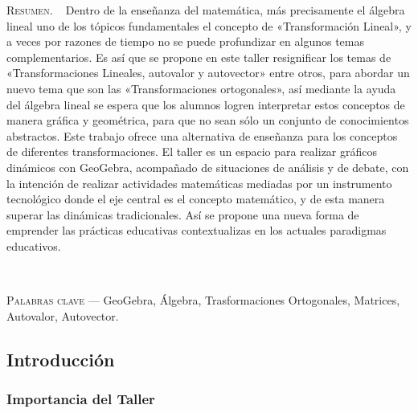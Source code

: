 \begin{center}
	\begin{minipage}{0.75\linewidth} \small
		\textsc{Resumen}. ~
		Dentro de la enseñanza del matemática, más precisamente el álgebra lineal uno de los tópicos fundamentales el concepto de «Transformación Lineal», y a veces por razones de tiempo no se puede profundizar en algunos temas complementarios. Es así que se propone en este taller resignificar los temas de «Transformaciones Lineales, autovalor y autovector» entre otros, para abordar un nuevo tema que son las «Transformaciones ortogonales», así mediante la ayuda del álgebra lineal se espera que los alumnos logren interpretar estos conceptos de manera gráfica y geométrica, para que no sean sólo un conjunto de conocimientos abstractos. Este trabajo ofrece una alternativa de enseñanza para los conceptos de diferentes transformaciones. El taller es un espacio para realizar gráficos dinámicos con GeoGebra, acompañado de situaciones de análisis y de debate, con la intención de realizar actividades matemáticas mediadas por un instrumento tecnológico donde el eje central es el concepto matemático, y de esta manera superar las dinámicas tradicionales. Así se propone una nueva forma de emprender las prácticas educativas contextualizas en los actuales paradigmas educativos.
	\end{minipage}\\
	
	\vspace{0.5em}
	
	\begin{minipage}{0.75\linewidth} \small
		\textsc{Palabras clave} --- GeoGebra, Álgebra, Trasformaciones Ortogonales, Matrices, Autovalor, Autovector.
	\end{minipage}
\end{center}

\subsection{Introducción}

\subsubsection{Importancia del Taller}

